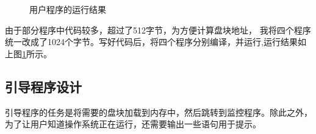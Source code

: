 \documentclass[a4paper, 11pt]{article} %
\begin{document}
\begin{figure}[H]
  \centering  %
          \caption{用户程序的运行结果}
          \label{Fig.main}
        \end{figure}
        
由于部分程序中代码较多，超过了512字节，为方便计算盘块地址，
我将四个程序统一改成了1024个字节。写好代码后，将四个程序分别编译，并运行,运行结果如上图\ref{Fig.main}所示。

\subsection{引导程序设计}
引导程序的任务是将需要的盘块加载到内存中，然后跳转到监控程序。除此之外，为了让用户知道操作系统正在运行，还需要输出一些语句用于提示。
\end{document}
